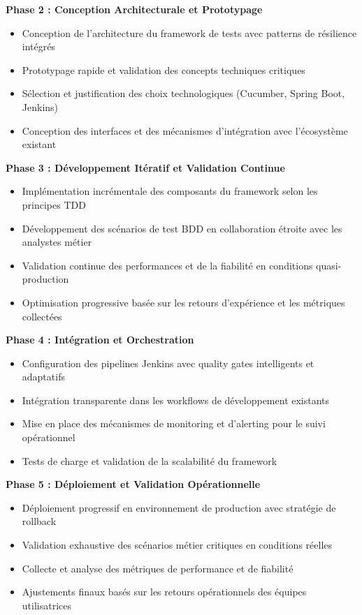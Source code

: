 \textbf{Phase 2 : Conception Architecturale et Prototypage}
\begin{itemize}
    \item Conception de l'architecture du framework de tests avec patterns de résilience intégrés
    \item Prototypage rapide et validation des concepts techniques critiques
    \item Sélection et justification des choix technologiques (Cucumber, Spring Boot, Jenkins)
    \item Conception des interfaces et des mécanismes d'intégration avec l'écosystème existant
\end{itemize}

\textbf{Phase 3 : Développement Itératif et Validation Continue}
\begin{itemize}
    \item Implémentation incrémentale des composants du framework selon les principes TDD
    \item Développement des scénarios de test BDD en collaboration étroite avec les analystes métier
    \item Validation continue des performances et de la fiabilité en conditions quasi-production
    \item Optimisation progressive basée sur les retours d'expérience et les métriques collectées
\end{itemize}

\textbf{Phase 4 : Intégration et Orchestration}
\begin{itemize}
    \item Configuration des pipelines Jenkins avec quality gates intelligents et adaptatifs
    \item Intégration transparente dans les workflows de développement existants
    \item Mise en place des mécanismes de monitoring et d'alerting pour le suivi opérationnel
    \item Tests de charge et validation de la scalabilité du framework
\end{itemize}

\textbf{Phase 5 : Déploiement et Validation Opérationnelle}
\begin{itemize}
    \item Déploiement progressif en environnement de production avec stratégie de rollback
    \item Validation exhaustive des scénarios métier critiques en conditions réelles
    \item Collecte et analyse des métriques de performance et de fiabilité
    \item Ajustements finaux basés sur les retours opérationnels des équipes utilisatrices
\end{itemize}

